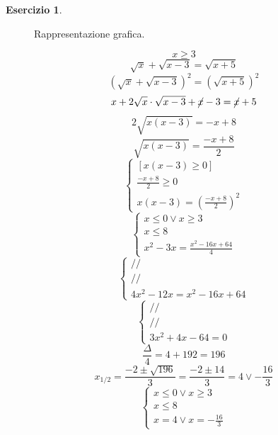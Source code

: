 \documentclass{article}
\theoremstyle{definition}
\newtheorem{exercise}{Esercizio}
\begin{document}
\begin{exercise}
\begin{figure}[htbp]
    \caption{Rappresentazione grafica.}
    \label{fig:schema_tikz}
\end{figure}
$$\boxed{x\ge3}$$
$$\sqrt{x}+\sqrt{x-3}=\sqrt{x+5}$$
$$\left(\sqrt{x}+\sqrt{x-3}\right)^2=\left(\sqrt{x+5}\right)^2$$
$$x+2\sqrt{x}\cdot\sqrt{x-3}+\cancel{x}-3=\cancel{x}+5$$
$$2\sqrt{x\left(x-3\right)}=-x+8$$
$$\sqrt{x\left(x-3\right)}=\frac{-x+8}{2}$$
$$\begin{cases}
    \left[x\left(x-3\right)\ge0\right]\\
    \frac{-x+8}{2}\ge0\\
    x\left(x-3\right)=\left(\frac{-x+8}{2}\right)^2
\end{cases}$$
$$\begin{cases}
    x\le0\lor x\ge3\\
    x\le8\\
    x^2-3x=\frac{x^2-16x+64}{4}
\end{cases}$$
$$\begin{cases}
    //\\
    //\\
    4x^2-12x=x^2-16x+64
\end{cases}$$
$$\begin{cases}
    //\\
    //\\
    3x^2+4x-64=0
\end{cases}$$
$$\frac{\Delta}{4}=4+192=196$$
$$x_{1/2}=\frac{-2\pm\sqrt{196}}{3}=\frac{-2\pm14}{3}=4\lor-\frac{16}{3}$$
$$\begin{cases}
    x\le0\lor x\ge3\\
    x\le8\\
    x=4\lor x=-\frac{16}{3}
\end{cases}$$
\begin{center}
\end{center}
\end{exercise}
\end{document}
